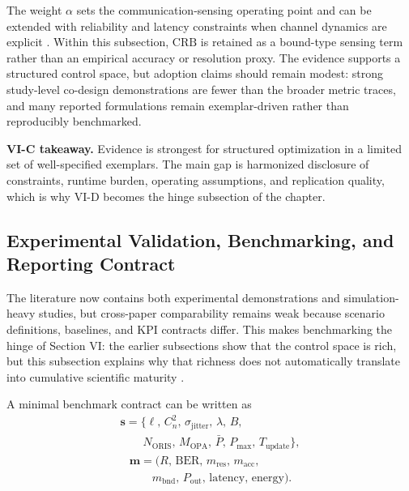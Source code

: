 \documentclass[letterpaper,journal]{IEEEtran}
\begin{document}
The weight $\alpha$ sets the communication-sensing operating point and can be extended with reliability and latency constraints when channel dynamics are explicit \cite{O_ISAC_023,O_ISAC_061,O_ISAC_091,O_ISAC_127}. Within this subsection, $\mathrm{CRB}$ is retained as a bound-type sensing term rather than an empirical accuracy or resolution proxy. The evidence supports a structured control space, but adoption claims should remain modest: strong study-level co-design demonstrations are fewer than the broader metric traces, and many reported formulations remain exemplar-driven rather than reproducibly benchmarked.

\textbf{VI-C takeaway.} Evidence is strongest for structured optimization in a limited set of well-specified exemplars. The main gap is harmonized disclosure of constraints, runtime burden, operating assumptions, and replication quality, which is why VI-D becomes the hinge subsection of the chapter.

\subsection{Experimental Validation, Benchmarking, and Reporting Contract}

The literature now contains both experimental demonstrations and simulation-heavy studies, but cross-paper comparability remains weak because scenario definitions, baselines, and KPI contracts differ. This makes benchmarking the hinge of Section VI: the earlier subsections show that the control space is rich, but this subsection explains why that richness does not automatically translate into cumulative scientific maturity \cite{O_ISAC_023,O_ISAC_035,O_ISAC_054,O_ISAC_061,O_ISAC_091,O_ISAC_103,O_ISAC_112,O_ISAC_127,O_ISAC_288,O_ISAC_300,O_ISAC_379}.

A minimal benchmark contract can be written as
\begin{equation}
    \begin{split}
        \mathbf{s}=\{\ell,\,C_n^2,\,\sigma_{\text{jitter}},\,\lambda,\,B, \\
        \qquad N_{\text{ORIS}},\,M_{\text{OPA}},\,\bar P,\,P_{\max},\,T_{\text{update}}\},
    \end{split}
\end{equation}
\begin{equation}
    \begin{split}
        \mathbf{m}=(R,\,\mathrm{BER},\,m_{\text{res}},\,m_{\text{acc}}, \\
        \qquad m_{\text{bnd}},\,P_{\text{out}},\,\text{latency},\,\text{energy}).
    \end{split}
\end{equation}
\end{document}
